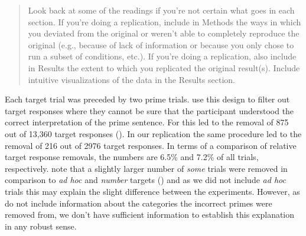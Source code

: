 \documentclass[10pt]{article}
\begin{document}
\begin{multicols}{2}
\begin{quote}
  Look back at some of the readings if you're not certain what goes in each section. If you're doing a replication, include in Methods the ways in which you deviated from the original or weren't able to completely reproduce the original (e.g., because of lack of information or because you only chose to run a subset of conditions, etc.). If you're doing a replication, also include in Results the extent to which you replicated the original result(s). Include intuitive visualizations of the data in the Results section.
\end{quote}

Each target trial was preceded by two prime trials.
\citeauthor{Bott:2016aa} use this design to filter out target responses where they cannot be sure that the participant understood the correct interpretation of the prime sentence.
For \citeauthor{Bott:2016aa} this led to the removal of 875 out of 13,360 target responses (\citeyear[124]{Bott:2016aa}).
In our replication the same procedure led to the removal of 216 out of 2976 target responses.
In terms of a comparison of relative target response removals, the numbers are 6.5\% and 7.2\% of all trials, respectively.
\citeauthor{Bott:2016aa} note that a slightly larger number of \emph{some} trials were removed in comparison to \emph{ad hoc} and \emph{number} targets (\citeyear[124]{Bott:2016aa}) and as we did not include \emph{ad hoc} trials this may explain the slight difference between the experiments.
However, as \citeauthor{Bott:2016aa} do not include information about the categories the incorrect primes were removed from, we don't have sufficient information to establish this explanation in any robust sense.


\end{multicols}
\end{document}
